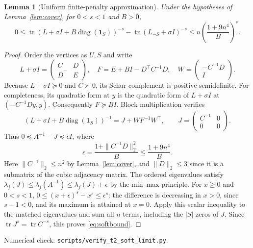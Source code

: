 \documentclass[11pt]{article}
\newtheorem{lemma}[theorem]{Lemma}
\DeclareMathOperator{\tr}{tr}
\DeclareMathOperator{\diag}{diag}
\newcommand{\ind}{\mathbf 1}
\begin{document}
\begin{lemma}[Uniform finite-penalty approximation]\label{lem:softlimit}
Under the hypotheses of Lemma~\ref{lem:cover}, for $0<s<1$ and $B>0$,
\begin{equation}\label{eq:softbound}
 0\leq \tr(L+\sigma I+B\diag(\ind_S))^{-s}
       -\tr(L_{-S}+\sigma I)^{-s}
 \leq n\left(\frac{1+9n^4}{B}\right)^s.
\end{equation}
\end{lemma}
\begin{proof}
Order the vertices as $U,S$ and write
\[
 L+\sigma I=\begin{pmatrix}C&D\\D^\top&E\end{pmatrix},\quad
 F=E+BI-D^\top C^{-1}D,\quad
 W=\begin{pmatrix}-C^{-1}D\\I\end{pmatrix}.
\]
Because $L+\sigma I\succeq0$ and $C\succ0$, its Schur complement is
positive semidefinite. For completeness, its quadratic form at $y$
is the quadratic form of $L+\sigma I$ at $(-C^{-1}Dy,y)$.
Consequently $F\succeq BI$. Block multiplication verifies
\[
 (L+\sigma I+B\diag(\ind_S))^{-1}
 =J+WF^{-1}W^\top,\qquad J=\begin{pmatrix}C^{-1}&0\\0&0\end{pmatrix}.
\]
Thus $0\preceq A^{-1}-J\preceq\epsilon I$, where
\[
 \epsilon=\frac{1+\|C^{-1}D\|_2^2}{B}
 \leq\frac{1+9n^4}{B}.
\]
Here $\|C^{-1}\|_2\leq n^2$ by Lemma~\ref{lem:cover}, and
$\|D\|_2\leq3$ since it is a submatrix of the cubic adjacency matrix.
The ordered eigenvalues satisfy
$\lambda_j(J)\leq\lambda_j(A^{-1})\leq\lambda_j(J)+\epsilon$
by the min--max principle. For $x\geq0$ and $0<s<1$,
$0\leq(x+\epsilon)^s-x^s\leq\epsilon^s$:
the difference is decreasing in $x>0$, since $s-1<0$, and its
maximum is attained at $x=0$. Apply this scalar inequality to the
matched eigenvalues and sum all $n$ terms, including the $|S|$ zeros
of $J$. Since $\tr J^s=\tr C^{-s}$, this proves \eqref{eq:softbound}.
\end{proof}
\noindent Numerical check: \texttt{scripts/verify\_t2\_soft\_limit.py}.
\end{document}
